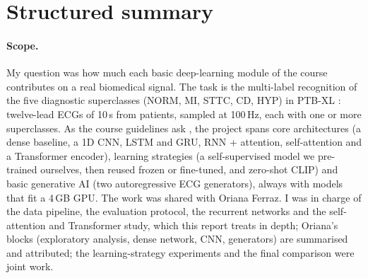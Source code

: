 \section*{Structured summary}

\paragraph{Scope.}
My question was how much each basic deep-learning module of the course contributes on a real
biomedical signal. The task is the multi-label recognition of the five diagnostic superclasses (NORM, MI,
STTC, CD, HYP) in PTB-XL \cite{wagner2020ptbxl,ptbxl_physionet,pollard2026physionet}: \edaNRecordsAll{}
twelve-lead ECGs of 10\,s from \edaNPatientsAll{} patients, sampled at 100\,Hz, each with one or more
superclasses. As the course guidelines ask \cite{course_message_2011}, the project spans core
architectures (a dense baseline, a 1D CNN, LSTM and GRU, RNN + attention, self-attention and a
Transformer encoder), learning strategies (a self-supervised model we pre-trained ourselves, then reused
frozen or fine-tuned, and zero-shot CLIP) and basic generative AI (two autoregressive ECG generators),
always with models that fit a 4\,GB GPU. The work was shared with Oriana Ferraz. I was in charge of the
data pipeline, the evaluation protocol, the recurrent networks and the self-attention and Transformer
study, which this report treats in depth; Oriana's blocks (exploratory analysis, dense network, CNN,
generators) are summarised and attributed; the learning-strategy experiments and the final comparison
were joint work.


